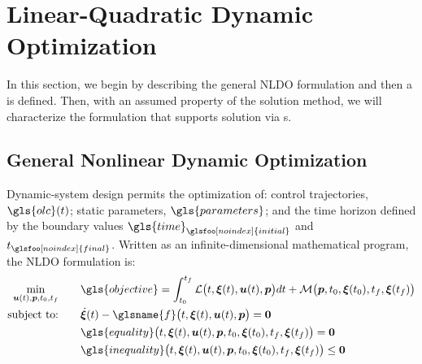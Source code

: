 \section{Linear-Quadratic Dynamic Optimization} \label{sec:ch5:lqdo}

In this section, we begin by describing the general NLDO formulation and then a \qp{} is defined. Then, with an assumed property of the solution method, we will characterize the \lqdo{} formulation that supports solution via {\qp}s.

\subsection{General Nonlinear Dynamic Optimization} \label{sec:ch5:gnldo}

Dynamic-system design permits the optimization of: control trajectories, $\gls{olc}(t)$; static parameters, $\gls{parameters}$; and the time horizon defined by the boundary values $\gls{time}_{\glsfoo[noindex]{initial}}$ and $t_{\glsfoo[noindex]{final}}$. Written as an infinite-dimensional mathematical program, the NLDO formulation is:%
\begin{subequations}%
\label{eq:ch5:NLDO}
\begin{align}
\min_{\bm{u}(t),\bm{p},t_0,t_f} \qquad& \gls{objective} = \int_{t_0}^{t_f} \mathcal{L} \big(t,\bm{\xi}(t),\bm{u}(t), \bm{p} \big) dt + \mathcal{M}\big(\bm{p}, t_0, \bm{\xi}(t_0), t_f, \bm{\xi}(t_f) \big) \label{eq:ch5:NLobj} \\
\text{subject to:} \qquad &  \hspace{0.0in} 
\dot{\bm{\xi}}(t) - \glsname{f}\big(t, \bm{\xi}(t), \bm{u}(t), \bm{p} \big) = \bm{0} \label{eq:ch5:NLdyn} \\
& \gls{equality}\big(t, \bm{\xi}(t), \bm{u}(t), \bm{p}, t_0, \bm{\xi}(t_0), t_f, \bm{\xi}(t_f) \big) = \bm{0}  \label{eq:ch5:NLeq} \\
& \gls{inequality}\big(t, \bm{\xi}(t), \bm{u}(t), \bm{p}, t_0, \bm{\xi}(t_0), t_f, \bm{\xi}(t_f) \big) \leq \bm{0}  \label{eq:ch5:NLineq}
\end{align}
\end{subequations}%

